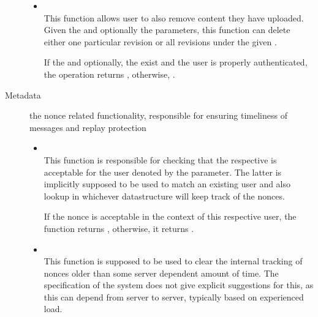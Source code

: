 \begin{description}
\begin{itemize}
  \item {} \\
  This function allows user to also remove content they have uploaded.
  Given the  and optionally the  parameters, this function can delete either one particular revision or all revisions under the given .

  If the  and optionally, the  exist and the user is properly authenticated, the operation returns , otherwise, .

  \end{itemize}
  \item[Metadata] the nonce related functionality, responsible for ensuring timeliness of messages and replay protection
  \begin{itemize}
  \item {} \\
  This function is responsible for checking that the respective  is acceptable for the user denoted by the  parameter.
  The latter is implicitly supposed to be used to match an existing user and also lookup in whichever datastructure will keep track of the nonces.

  If the nonce is acceptable in the context of this respective user, the function returns , otherwise, it returns .

  \item {} \\
  This function is supposed to be used to clear the internal tracking of nonces older than some server dependent amount of time.
  The specification of the system does not give explicit suggestions for this, as this can depend from server to server, typically based on experienced load.
  \end{itemize}
\end{description}

